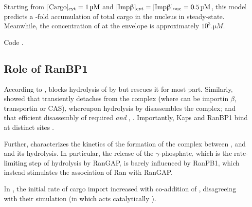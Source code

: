 \documentclass[12pt,notitlepage]{article}
\begin{document}
%

Starting from 
$[\ce{Cargo}]_\text{cyt} = \SI{1}{\micro M}$
and
$[\ce{Imp\beta}]_\text{cyt} = [\ce{Imp\beta}]_\text{nuc} = \SI{0.5}{\micro M}$,
this model
predicts a 
\protect\unskip%
-fold accumulation
of total cargo in the nucleus
in steady-state.
%
Meanwhile,
the concentration of 
at the envelope is approximately $10^3 \si{. \micro M}$.

Code .







\subsection{Role of RanBP1}

According to 
\cite[\href{https://i.ibb.co/6ghqPB7/image.jpg}{Fig.~4A}]{LounsburyMacara1997},
 blocks hydrolysis of  by 
but 
 rescues it for most part.
%
Similarly,
\cite{BischoffGoerlich1997}
showed that
 transiently detaches  
from the complex 
(where  can be importin $\beta$, transportin or CAS),
whereupon hydrolysis by  
disassembles the complex;
and
that efficient disassembly 
of  required  \emph{and} 
\cite[\S3.2, cf.~\href{https://i.ibb.co/PZKRSJ0/image.jpg}{Fig.~4}]{BischoffGoerlich1997},
\cite{FloerBlobelRexach1997}.
%
%
Importantly,
Kaps and RanBP1
bind 
at distinct sites
\cite[p.253]{BischoffGoerlich1997}.

%

Further,
\cite[\href{https://i.ibb.co/jz37PW1/image.png}{Fig.~13}]{SeewaldETAL2003}
characterizes
the kinetics of the formation of the complex
between
,  and 
and its hydrolysis.
%
%
In particular, 
the release of the $\gamma$-phosphate,
which is the rate-limiting step of 
hydrolysis by RanGAP,
is barely influenced by RanPB1,
which instead stimulates
the association of Ran with RanGAP.

%

In \cite[p.1033]{RiddickMacara2005},
the initial rate of cargo import
increased with co-addition of ,
disagreeing with their simulation
(in which  acts catalytically \cite[\href{https://i.ibb.co/B3sgJ1P/image.png}{Fig.~S1}]{RiddickMacara2005}).
%
%
\end{document}
